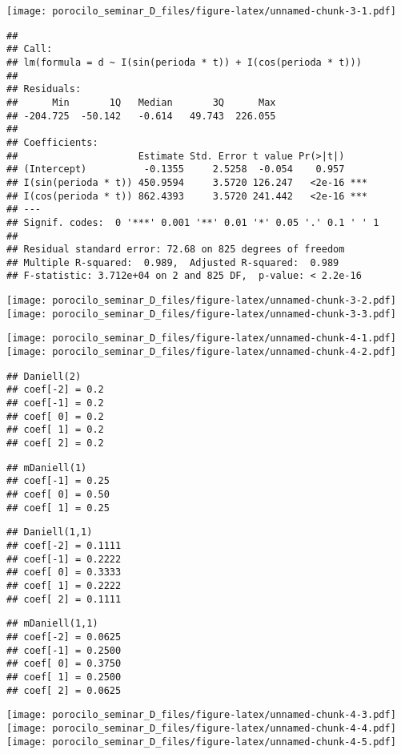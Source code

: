 \documentclass[
]{article}
\begin{document}
\texttt{[image: porocilo\_seminar\_D\_files/figure-latex/unnamed-chunk-3-1.pdf]}

\begin{verbatim}
## 
## Call:
## lm(formula = d ~ I(sin(perioda * t)) + I(cos(perioda * t)))
## 
## Residuals:
##      Min       1Q   Median       3Q      Max 
## -204.725  -50.142   -0.614   49.743  226.055 
## 
## Coefficients:
##                     Estimate Std. Error t value Pr(>|t|)    
## (Intercept)          -0.1355     2.5258  -0.054    0.957    
## I(sin(perioda * t)) 450.9594     3.5720 126.247   <2e-16 ***
## I(cos(perioda * t)) 862.4393     3.5720 241.442   <2e-16 ***
## ---
## Signif. codes:  0 '***' 0.001 '**' 0.01 '*' 0.05 '.' 0.1 ' ' 1
## 
## Residual standard error: 72.68 on 825 degrees of freedom
## Multiple R-squared:  0.989,  Adjusted R-squared:  0.989 
## F-statistic: 3.712e+04 on 2 and 825 DF,  p-value: < 2.2e-16
\end{verbatim}

\texttt{[image: porocilo\_seminar\_D\_files/figure-latex/unnamed-chunk-3-2.pdf]}
\texttt{[image: porocilo\_seminar\_D\_files/figure-latex/unnamed-chunk-3-3.pdf]}

\texttt{[image: porocilo\_seminar\_D\_files/figure-latex/unnamed-chunk-4-1.pdf]}
\texttt{[image: porocilo\_seminar\_D\_files/figure-latex/unnamed-chunk-4-2.pdf]}

\begin{verbatim}
## Daniell(2) 
## coef[-2] = 0.2
## coef[-1] = 0.2
## coef[ 0] = 0.2
## coef[ 1] = 0.2
## coef[ 2] = 0.2
\end{verbatim}

\begin{verbatim}
## mDaniell(1) 
## coef[-1] = 0.25
## coef[ 0] = 0.50
## coef[ 1] = 0.25
\end{verbatim}

\begin{verbatim}
## Daniell(1,1) 
## coef[-2] = 0.1111
## coef[-1] = 0.2222
## coef[ 0] = 0.3333
## coef[ 1] = 0.2222
## coef[ 2] = 0.1111
\end{verbatim}

\begin{verbatim}
## mDaniell(1,1) 
## coef[-2] = 0.0625
## coef[-1] = 0.2500
## coef[ 0] = 0.3750
## coef[ 1] = 0.2500
## coef[ 2] = 0.0625
\end{verbatim}

\texttt{[image: porocilo\_seminar\_D\_files/figure-latex/unnamed-chunk-4-3.pdf]}
\texttt{[image: porocilo\_seminar\_D\_files/figure-latex/unnamed-chunk-4-4.pdf]}
\texttt{[image: porocilo\_seminar\_D\_files/figure-latex/unnamed-chunk-4-5.pdf]}
\end{document}

